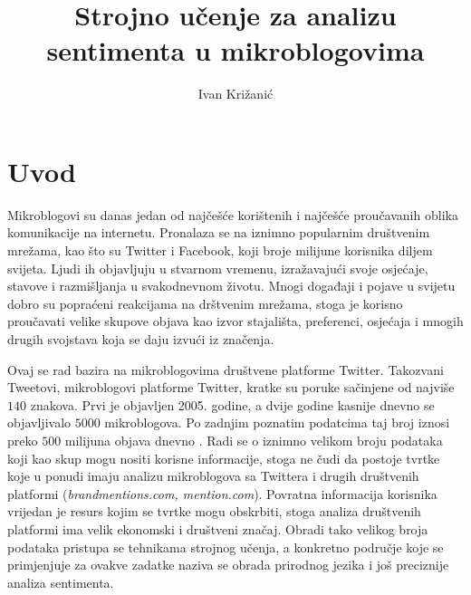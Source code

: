 \documentclass[times, utf8, zavrsni]{fer}
\begin{document}

\title{Strojno učenje za analizu sentimenta u mikroblogovima}

\author{Ivan Križanić}

\maketitle

\izvornik


\tableofcontents

\chapter{Uvod}

Mikroblogovi su danas jedan od najčešće korištenih i najčešće proučavanih oblika komunikacije na internetu. Pronalaza se na iznimno popularnim društvenim mrežama, kao što su Twitter i Facebook, koji broje milijune korisnika diljem svijeta. Ljudi ih objavljuju u stvarnom vremenu, izražavajući svoje osjećaje, stavove i razmišljanja u svakodnevnom životu. Mnogi događaji i pojave u svijetu dobro su popraćeni reakcijama na drštvenim mrežama, stoga je korisno proučavati velike skupove objava kao izvor stajališta, preferenci, osjećaja i mnogih drugih svojstava koja se daju izvući iz značenja. 

Ovaj se rad bazira na mikroblogovima društvene platforme Twitter. Takozvani Tweetovi, mikroblogovi platforme Twitter, kratke su poruke sačinjene od najviše $140$ znakova. Prvi je objavljen 2005. godine, a dvije godine kasnije dnevno se objavljivalo $5000$ mikroblogova. Po zadnjim poznatim podatcima taj broj iznosi preko $500$ milijuna objava dnevno \citep{twitterStats}. Radi se o iznimno velikom broju podataka koji kao skup mogu nositi korisne informacije, stoga ne čudi da postoje tvrtke koje u ponudi imaju analizu mikroblogova sa Twittera i drugih društvenih platformi (\textit{brandmentions.com, mention.com}). Povratna informacija korisnika vrijedan je resurs kojim se tvrtke mogu obskrbiti, stoga analiza društvenih platformi ima velik ekonomski i društveni značaj. Obradi tako velikog broja podataka pristupa se tehnikama strojnog učenja, a konkretno područje koje se primjenjuje za ovakve zadatke naziva se obrada prirodnog jezika i još preciznije analiza sentimenta. 
\end{document}
